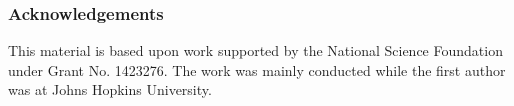 \documentclass[a0,landscape]{a0poster}
\begin{document}
\begin{multicols}{4}

\subsubsection*{Acknowledgements}
This material is based upon work supported by the National Science Foundation under Grant No. 1423276.  The work was mainly conducted while the first author was at Johns Hopkins University.



\end{multicols}
\end{document}
